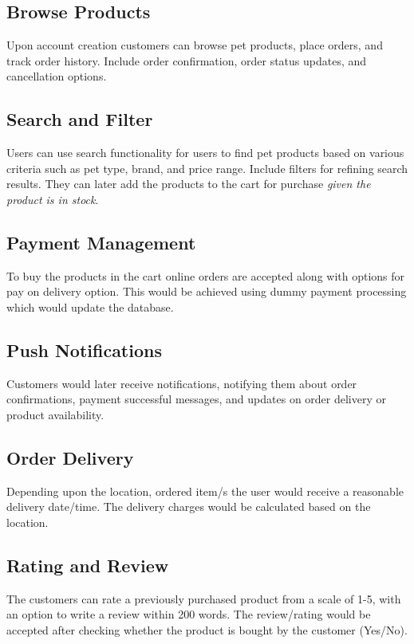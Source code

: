 \documentclass{article}
\begin{document}
\subsection{Browse Products}

Upon account creation customers can browse pet products, place orders, and track order history. Include order confirmation, order status updates, and cancellation options.

\subsection{Search and Filter}

Users can use search functionality for users to find pet products based on various criteria such as pet type, brand, and price range. Include filters for refining search results. They can later add the products to the cart for purchase \emph{given the product is in stock}.

\subsection{Payment Management}

To buy the products in the cart online orders are accepted along with options for pay on delivery option. This would be achieved using dummy payment processing which would update the database. 

\subsection{Push Notifications}

Customers would later receive notifications, notifying them about order confirmations, payment successful messages, and updates on order delivery or product availability.

\subsection{Order Delivery}

Depending upon the location, ordered item/s the user would receive a reasonable delivery date/time.
The delivery charges would be calculated based on the location.

\subsection{Rating and Review}

The customers can rate a previously purchased product from a scale of 1-5, with an option to write a review within 200 words.
The review/rating would be accepted after checking whether the product is bought by the customer (Yes/No).
\end{document}
